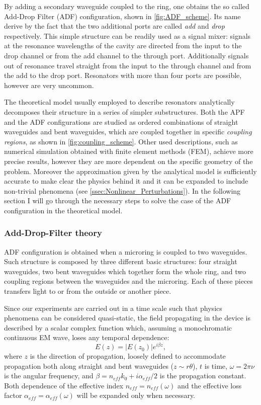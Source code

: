 By adding a secondary waveguide coupled to the ring, one obtains the so called Add-Drop Filter (ADF) configuration, shown in \autoref{fig:ADF_scheme}.
Its name derive by the fact that the two additional ports are called \textit{add} and \textit{drop} respectively.
This simple structure can be readily used as a signal mixer: signals at the resonance wavelengths of the cavity are directed from the input to the drop channel or from the add channel to the through port.
Additionally signals out of resonance travel straight from the input to the through channel and from the add to the drop port.
Resonators with more than four ports are possible, however are very uncommon.

The theoretical model usually employed to describe resonators analytically decomposes their structure in a series of simpler substructures.
Both the APF and the ADF configurations are studied as ordered combinations of straight waveguides and bent waveguides, which are coupled together in specific \textit{coupling regions}, as shown in \autoref{fig:coupling_scheme}.
Other used descriptions, such as numerical simulation obtained with finite element methods (FEM), achieve more precise results, however they are more dependent on the specific geometry of the problem.
Moreover the approximation given by the analytical model is sufficiently accurate to make clear the physics behind it and it can be expanded to include non-trivial phenomena (see \autoref{ssec:Nonlinear_Perturbations}).
In the following section I will go through the necessary steps to solve the case of the ADF configuration in the theoretical model.

\subsubsection{Add-Drop-Filter theory}
\label{sssec:Add-Drop-Filter_theory}
ADF configuration is obtained when a microring is coupled to two waveguides.
Such structure is composed by three different basic structures: four straight waveguides, two bent waveguides which together form the whole ring, and two coupling regions between the waveguides and the microring.
Each of these pieces transfers light to or from the outside or another piece.

Since our experiments are carried out in a time scale such that physics phenomena can be considered quasi-static, the field propagating in the device is described by a scalar complex function which, assuming a monochromatic continuous EM wave, loses any temporal dependence:
\begin{equation}
	E(z) = |E(z_0)|e^{i\beta z},
\end{equation}
where $z$ is the direction of propagation, loosely defined to accommodate propagation both along straight and bent waveguides ($z\sim r\theta$), $t$ is time, $\omega=2\pi\nu$ is the angular frequency, and $\beta = n_{eff}k_0+i\alpha_{eff}/2$ is the propagation constant.
Both dependence of the effective index $n_{eff}=n_{eff}\left(\omega\right)$ and the effective loss factor $\alpha_{eff}=\alpha_{eff}\left(\omega\right)$ will be expanded only when necessary.

